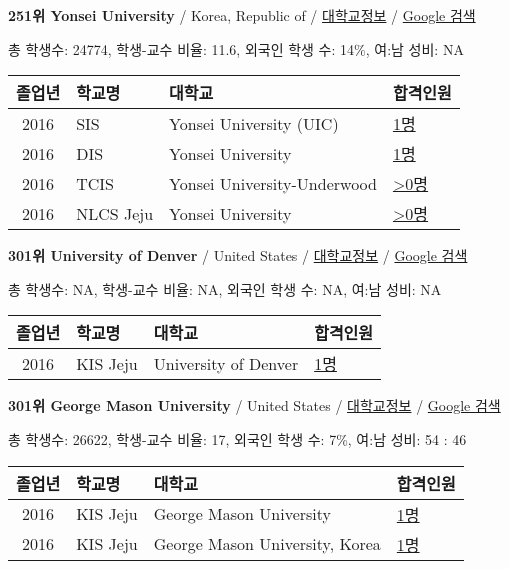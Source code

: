 \documentclass[13pt,]{article}
\begin{document}
\textbf{251위 Yonsei University} / Korea, Republic of /
\href{https://www.timeshighereducation.com/world-university-rankings/yonsei-university?ranking-dataset=589595}{대학교정보}
/ \href{http://www.google.com/search?q=Yonsei+University}{Google 검색}

총 학생수: 24774, 학생-교수 비율: 11.6, 외국인 학생 수: 14\%, 여:남
성비: NA

\begin{longtable}[]{@{}clll@{}}
\toprule
졸업년 & 학교명 & 대학교 & 합격인원\tabularnewline
\midrule
\endhead
2016 & SIS & Yonsei University (UIC) &
\href{http://cafe.naver.com/assarabia/11589}{1명}\tabularnewline
2016 & DIS & Yonsei University &
\href{http://cafe.naver.com/assarabia/11591}{1명}\tabularnewline
2016 & TCIS & Yonsei University-Underwood &
\href{http://cafe.naver.com/assarabia/11598}{\textgreater{}0명}\tabularnewline
2016 & NLCS Jeju & Yonsei University &
\href{http://cafe.naver.com/assarabia/11592}{\textgreater{}0명}\tabularnewline
\bottomrule
\end{longtable}

\textbf{301위 University of Denver} / United States /
\href{https://www.timeshighereducation.com/world-university-rankings/university-denver?ranking-dataset=589595}{대학교정보}
/ \href{http://www.google.com/search?q=University+of+Denver}{Google
검색}

총 학생수: NA, 학생-교수 비율: NA, 외국인 학생 수: NA, 여:남 성비: NA

\begin{longtable}[]{@{}clll@{}}
\toprule
졸업년 & 학교명 & 대학교 & 합격인원\tabularnewline
\midrule
\endhead
2016 & KIS Jeju & University of Denver &
\href{http://cafe.naver.com/assarabia/11596}{1명}\tabularnewline
\bottomrule
\end{longtable}

\textbf{301위 George Mason University} / United States /
\href{https://www.timeshighereducation.com/world-university-rankings/george-mason-university?ranking-dataset=589595}{대학교정보}
/ \href{http://www.google.com/search?q=George+Mason+University}{Google
검색}

총 학생수: 26622, 학생-교수 비율: 17, 외국인 학생 수: 7\%, 여:남 성비:
54 : 46

\begin{longtable}[]{@{}clll@{}}
\toprule
졸업년 & 학교명 & 대학교 & 합격인원\tabularnewline
\midrule
\endhead
2016 & KIS Jeju & George Mason University &
\href{http://cafe.naver.com/assarabia/11596}{1명}\tabularnewline
2016 & KIS Jeju & George Mason University, Korea &
\href{http://cafe.naver.com/assarabia/11596}{1명}\tabularnewline
\bottomrule
\end{longtable}
\end{document}
